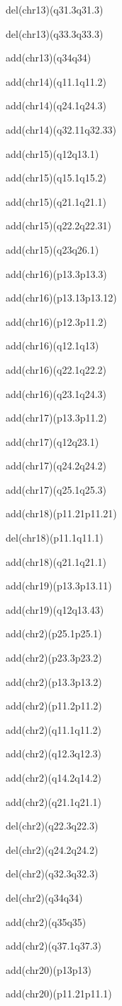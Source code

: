 \documentclass[]{article}
\begin{document}
del(chr13)(q31.3q31.3)

del(chr13)(q33.3q33.3)

add(chr13)(q34q34)

add(chr14)(q11.1q11.2)

add(chr14)(q24.1q24.3)

add(chr14)(q32.11q32.33)

add(chr15)(q12q13.1)

add(chr15)(q15.1q15.2)

add(chr15)(q21.1q21.1)

add(chr15)(q22.2q22.31)

add(chr15)(q23q26.1)

add(chr16)(p13.3p13.3)

add(chr16)(p13.13p13.12)

add(chr16)(p12.3p11.2)

add(chr16)(q12.1q13)

add(chr16)(q22.1q22.2)

add(chr16)(q23.1q24.3)

add(chr17)(p13.3p11.2)

add(chr17)(q12q23.1)

add(chr17)(q24.2q24.2)

add(chr17)(q25.1q25.3)

add(chr18)(p11.21p11.21)

del(chr18)(p11.1q11.1)

add(chr18)(q21.1q21.1)

add(chr19)(p13.3p13.11)

add(chr19)(q12q13.43)

add(chr2)(p25.1p25.1)

add(chr2)(p23.3p23.2)

add(chr2)(p13.3p13.2)

add(chr2)(p11.2p11.2)

add(chr2)(q11.1q11.2)

add(chr2)(q12.3q12.3)

add(chr2)(q14.2q14.2)

add(chr2)(q21.1q21.1)

del(chr2)(q22.3q22.3)

del(chr2)(q24.2q24.2)

del(chr2)(q32.3q32.3)

del(chr2)(q34q34)

add(chr2)(q35q35)

add(chr2)(q37.1q37.3)

add(chr20)(p13p13)

add(chr20)(p11.21p11.1)
\end{document}
